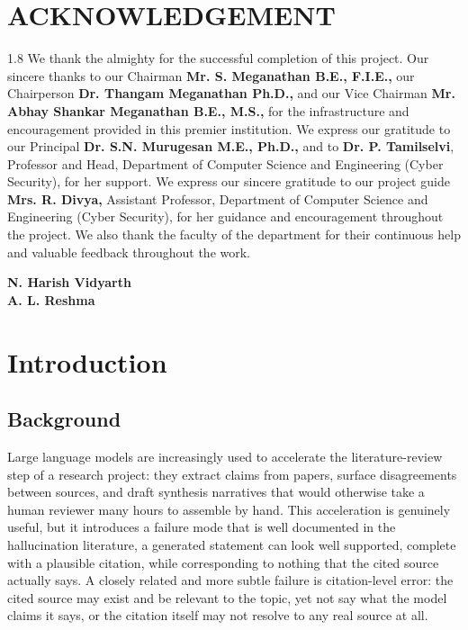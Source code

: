 \documentclass[12pt,a4paper]{report}
\newcommand{\Usefont}[1]{\fontfamily{#1}\selectfont}
\begin{document}
\chapter*{ACKNOWLEDGEMENT}
\thispagestyle{plain}
\begin{spacing}{1.8}
We thank the almighty for the successful completion of this project. Our sincere
thanks to our Chairman \textbf{Mr. S. Meganathan B.E., F.I.E.,} our Chairperson
\textbf{Dr. Thangam Meganathan Ph.D.,} and our Vice Chairman \textbf{Mr. Abhay Shankar Meganathan
B.E., M.S.,} for the infrastructure and encouragement provided in this premier
institution. We express our gratitude to our Principal \textbf{Dr. S.N. Murugesan M.E.,
Ph.D.,} and to \textbf{Dr. P. Tamilselvi}, Professor and Head, Department of Computer
Science and Engineering (Cyber Security), for her support. We express our sincere
gratitude to our project guide \textbf{Mrs. R. Divya,} Assistant Professor, Department
of Computer Science and Engineering (Cyber Security), for her guidance and
encouragement throughout the project. We also thank the faculty of the
department for their continuous help and valuable feedback throughout the work.
\end{spacing}
\begin{flushright}
{\Usefont{ppl}\large\bfseries N. Harish Vidyarth}\\
{\Usefont{ppl}\large\bfseries A. L. Reshma}
\end{flushright}
\clearpage

\tableofcontents
\clearpage
\listoftables
{}
\clearpage
\listoffigures
{}
\clearpage

\chapter{Introduction}
\label{ch:intro}

\section{Background}
Large language models are increasingly used to accelerate the literature-review
step of a research project: they extract claims from papers, surface
disagreements between sources, and draft synthesis narratives that would
otherwise take a human reviewer many hours to assemble by hand. This
acceleration is genuinely useful, but it introduces a failure mode that is well
documented in the hallucination literature, a generated statement can look
well supported, complete with a plausible citation, while corresponding to
nothing that the cited source actually says. A closely related and more subtle
failure is citation-level error: the cited source may exist and be relevant to
the topic, yet not say what the model claims it says, or the citation itself may
not resolve to any real source at all.
\end{document}
